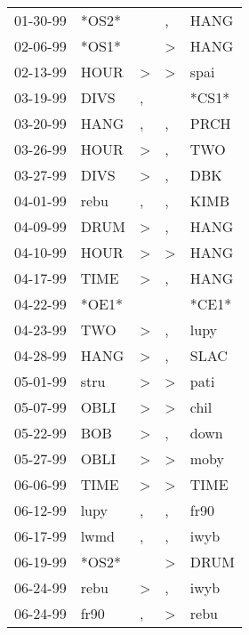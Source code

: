 \begin{supertabular}{lllll}
 01-30-99 &  *OS2* &                  &                , &   HANG \\
 02-06-99 &  *OS1* &                  &     \textgreater &   HANG \\
 02-13-99 &   HOUR &     \textgreater &     \textgreater &   spai \\
 03-19-99 &   DIVS &                , &                  &  *CS1* \\
 03-20-99 &   HANG &                , &                , &   PRCH \\
 03-26-99 &   HOUR &     \textgreater &                , &    TWO \\
 03-27-99 &   DIVS &     \textgreater &                , &    DBK \\
 04-01-99 &   rebu &                , &                , &   KIMB \\
 04-09-99 &   DRUM &     \textgreater &                , &   HANG \\
 04-10-99 &   HOUR &     \textgreater &     \textgreater &   HANG \\
 04-17-99 &   TIME &     \textgreater &                , &   HANG \\
 04-22-99 &  *OE1* &                  &                  &  *CE1* \\
 04-23-99 &    TWO &     \textgreater &                , &   lupy \\
 04-28-99 &   HANG &     \textgreater &                , &   SLAC \\
 05-01-99 &   stru &     \textgreater &     \textgreater &   pati \\
 05-07-99 &   OBLI &     \textgreater &     \textgreater &   chil \\
 05-22-99 &    BOB &     \textgreater &                , &   down \\
 05-27-99 &   OBLI &     \textgreater &     \textgreater &   moby \\
 06-06-99 &   TIME &     \textgreater &     \textgreater &   TIME \\
 06-12-99 &   lupy &                , &                , &   fr90 \\
 06-17-99 &   lwmd &                , &                , &   iwyb \\
 06-19-99 &  *OS2* &                  &     \textgreater &   DRUM \\
 06-24-99 &   rebu &     \textgreater &                , &   iwyb \\
 06-24-99 &   fr90 &                , &     \textgreater &   rebu \\

\end{supertabular}
